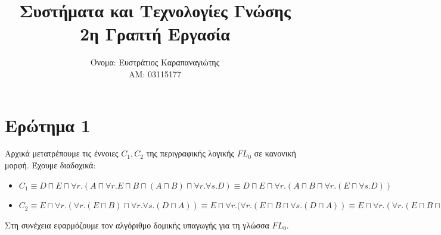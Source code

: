 \documentclass[10pt]{article}
\title{Συστήματα και Τεχνολογίες Γνώσης\\ \small{2η Γραπτή Εργασία}}
\author{Όνομα: Ευστράτιος Καραπαναγιώτης\\ \small{ΑΜ: 03115177}}
\begin{document}
	\maketitle
	
	\section*{Ερώτημα 1}
	Αρχικά μετατρέπουμε τις έννοιες $C_1, C_2$ της περιγραφικής λογικής $FL_0$ σε κανονική μορφή. Έχουμε διαδοχικά:
	\begin{itemize}
		\item $C_1 \equiv D \sqcap E \sqcap \forall r.(A \sqcap \forall r.E \sqcap B \sqcap (A \sqcap B) \sqcap \forall r.\forall s.D) \equiv D \sqcap E \sqcap \forall r.(A \sqcap B \sqcap \forall r. (E \sqcap \forall s.D))$
		
		\item $C_2 \equiv E \sqcap \forall r.(\forall r.(E \sqcap B) \sqcap \forall r.\forall s.(D \sqcap A)) \equiv E \sqcap \forall r.(\forall r.(E \sqcap B \sqcap \forall s.(D \sqcap A)) \equiv E \sqcap \forall r.(\forall r.(E \sqcap B \sqcap \forall s.D \sqcap \forall s.A))$
	\end{itemize}

	Στη συνέχεια εφαρμόζουμε τον αλγόριθμο δομικής υπαγωγής για τη γλώσσα $FL_0$.
	
\end{document}
